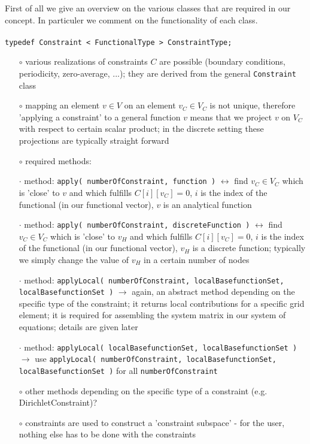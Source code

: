 \documentclass[a4paper,11pt]{article}
\numberwithin{equation}{section}
\begin{document}
First of all we give an overview on the various classes that are required in our concept. In particuler we comment on the functionality of each class.\\
\\
{\tt typedef Constraint < FunctionalType > ConstraintType;}
\begin{itemize}
\item[$\circ$] various realizations of constraints $C$ are possible (boundary conditions, periodicity, zero-average, ...); they are derived from the general {\tt Constraint} class
\item[$\circ$] mapping an element $v\in V$ on an element $v_C \in V_C$ is not unique, therefore 'applying a constraint' to a general function $v$ means that we project $v$ on $V_C$ with respect to certain scalar product; in the discrete setting these projections are typically straight forward
\item[$\circ$] required methods:
\item[$\cdot$] method: {\tt apply( numberOfConstraint, function )} $\leftrightarrow$ find $v_C \in V_C$ which is 'close' to $v$ and which fulfills $C[i][v_C]=0$, $i$ is the index of the functional (in our functional vector), $v$ is an analytical function
\item[$\cdot$] method: {\tt apply( numberOfConstraint, discreteFunction )} $\leftrightarrow$ find $v_C \in V_C$ which is 'close' to $v_H$ and which fulfills $C[i][v_C]=0$, $i$ is the index of the functional (in our functional vector), $v_H$ is a discrete function; typically we simply change the value of $v_H$ in a certain number of nodes
\item[$\cdot$] method: {\tt applyLocal( numberOfConstraint, localBasefunctionSet, \\ localBasefunctionSet )} $\rightarrow$ again, an abstract method depending on the specific type of the constraint; it returns local contributions for a specific grid element; it is required for assembling the system matrix in our system of equations; details are given later
\item[$\cdot$] method: {\tt applyLocal( localBasefunctionSet, localBasefunctionSet )} $\rightarrow$ use {\tt applyLocal( numberOfConstraint, localBasefunctionSet, \\ localBasefunctionSet )} for all {\tt numberOfConstraint}
\item[$\circ$] other methods depending on the specific type of a constraint (e.g. DirichletConstraint)?
\item[$\circ$] constraints are used to construct a 'constraint subspace' - for the user, nothing else has to be done with the constraints
\end{itemize}
\end{document}
